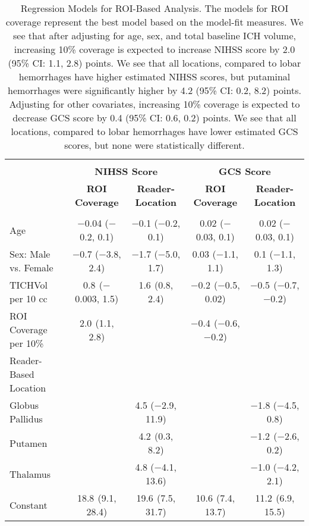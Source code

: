 
\begin{table}[!htbp] \centering 
\begin{tabular}{@{\extracolsep{5pt}}lcccc} 
\\[-1.8ex]\hline 
\\[-1.8ex] & \multicolumn{2}{c}{\textbf{NIHSS Score}} & \multicolumn{2}{c}{\textbf{GCS Score}} \\ 
 & \textbf{ROI Coverage} & \textbf{Reader-Location} & \textbf{ROI Coverage} & \textbf{Reader-Location} \\ 
\hline \\[-1.8ex] 
 Age & $-$0.04 ($-$0.2, 0.1) & $-$0.1 ($-$0.2, 0.1) & 0.02 ($-$0.03, 0.1) & 0.02 ($-$0.03, 0.1) \\ 
  Sex: Male vs. Female & $-$0.7 ($-$3.8, 2.4) & $-$1.7 ($-$5.0, 1.7) & 0.03 ($-$1.1, 1.1) & 0.1 ($-$1.1, 1.3) \\ 
  TICHVol per 10 cc & 0.8$^{}$ ($-$0.003, 1.5) & 1.6$^{}$ (0.8, 2.4) & $-$0.2$^{}$ ($-$0.5, 0.02) & $-$0.5$^{}$ ($-$0.7, $-$0.2) \\ 
  ROI Coverage per 10\% & 2.0$^{}$ (1.1, 2.8) &  & $-$0.4$^{}$ ($-$0.6, $-$0.2) &  \\ 
  Reader-Based Location&&&& \\
\;\;Globus Pallidus &  & 4.5 ($-$2.9, 11.9) &  & $-$1.8 ($-$4.5, 0.8) \\ 
  \;\;Putamen &  & 4.2$^{}$ (0.3, 8.2) &  & $-$1.2$^{}$ ($-$2.6, 0.2) \\ 
  \;\;Thalamus &  & 4.8 ($-$4.1, 13.6) &  & $-$1.0 ($-$4.2, 2.1) \\ 
  Constant & 18.8$^{}$ (9.1, 28.4) & 19.6$^{}$ (7.5, 31.7) & 10.6$^{}$ (7.4, 13.7) & 11.2$^{}$ (6.9, 15.5) \\ 
\hline 
\end{tabular} 
  \caption{Regression Models for ROI-Based Analysis. The models for ROI coverage represent the best model based on the model-fit measures. We see that after adjusting for age, sex, and total baseline ICH volume, increasing 10\% coverage is expected to increase NIHSS score by 2.0 (95\% CI: 1.1, 2.8) points.  We see that all locations, compared to lobar hemorrhages have higher estimated NIHSS scores, but putaminal hemorrhages were significantly higher by 4.2 (95\% CI: 0.2, 8.2) points. Adjusting for other covariates, increasing 10\% coverage is expected to decrease GCS score by 0.4 (95\% CI: 0.6, 0.2) points.  We see that all locations, compared to lobar hemorrhages have lower estimated GCS scores, but none were statistically different.} 
  \label{f:beta} 
\end{table} 
